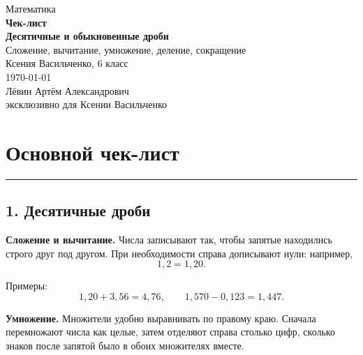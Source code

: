 \documentclass[a4paper,12pt]{article}
\newcommand{\accentline}{%
  \par\noindent
  \textcolor{accent}{\rule{\linewidth}{0.5pt}}
  \par
}
\begin{document}
\begin{titlepage}
\thispagestyle{empty}
\centering
\vspace*{2.5cm}

{\Large\textcolor{darkaccent}{Математика}}\\[1.0cm]

{\huge\bfseries Чек-лист}\\[0.45cm]

{\LARGE\bfseries
Десятичные и обыкновенные дроби}\\[0.55cm]

{\large
Сложение, вычитание, умножение, деление, сокращение}\\[1.4cm]

{\large Ксения Васильченко, 6 класс}\\[1.0cm]

{\large \today}\\[1.8cm]

{\large Лёвин Артём Александрович}\\[0.25cm]

{\large эксклюзивно для Ксении Васильченко}

\vfill


\vspace*{0.8cm}
\end{titlepage}

\section*{Основной чек-лист}
\accentline

\subsection*{1. Десятичные дроби}

\textbf{Сложение и вычитание.}
Числа записывают так, чтобы запятые находились строго
друг под другом. При необходимости справа дописывают нули:
например,
\[
1{,}2=1{,}20.
\]

Примеры:
\[
1{,}20+3{,}56=4{,}76,
\qquad
1{,}570-0{,}123=1{,}447.
\]

\textbf{Умножение.}
Множители удобно выравнивать по правому краю.
Сначала перемножают числа как целые, затем отделяют справа
столько цифр, сколько знаков после запятой было
в обоих множителях вместе.
\end{document}
